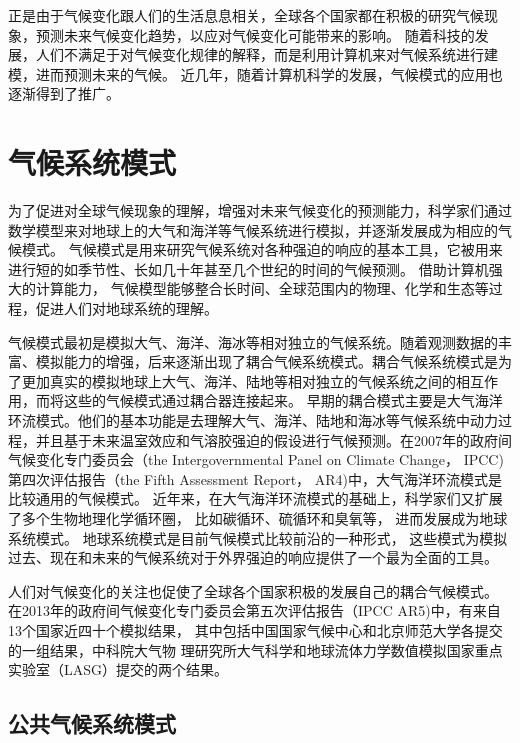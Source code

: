  
正是由于气候变化跟人们的生活息息相关，全球各个国家都在积极的研究气候现象，预测未来气候变化趋势，以应对气候变化可能带来的影响。 
随着科技的发展，人们不满足于对气候变化规律的解释，而是利用计算机来对气候系统进行建模，进而预测未来的气候。
近几年，随着计算机科学的发展，气候模式的应用也逐渐得到了推广。  



 
\section{气候系统模式}

为了促进对全球气候现象的理解，增强对未来气候变化的预测能力，科学家们通过数学模型来对地球上的大气和海洋等气候系统进行模拟，并逐渐发展成为相应的气候模式。
气候模式是用来研究气候系统对各种强迫的响应的基本工具，它被用来进行短的如季节性、长如几十年甚至几个世纪的时间的气候预测。 
借助计算机强大的计算能力， 气候模型能够整合长时间、全球范围内的物理、化学和生态等过程，促进人们对地球系统的理解\cite{hurrell2013community}。


气候模式最初是模拟大气、海洋、海冰等相对独立的气候系统。随着观测数据的丰富、模拟能力的增强，后来逐渐出现了耦合气候系统模式。耦合气候系统模式是为了更加真实的模拟地球上大气、海洋、陆地等相对独立的气候系统之间的相互作用，而将这些的气候模式通过耦合器连接起来。
早期的耦合模式主要是大气海洋环流模式。他们的基本功能是去理解大气、海洋、陆地和海冰等气候系统中动力过程，并且基于未来温室效应和气溶胶强迫的假设进行气候预测。在2007年的政府间气候变化专门委员会（the
Intergovernmental Panel on Climate Change， IPCC) 第四次评估报告（the Fifth Assessment
Report， AR4)中，大气海洋环流模式是比较通用的气候模式\cite{solomon2007climate}。
近年来，在大气海洋环流模式的基础上，科学家们又扩展了多个生物地理化学循环圈， 比如碳循环、硫循环和臭氧等， 进而发展成为地球系统模式。 地球系统模式是目前气候模式比较前沿的一种形式，
这些模式为模拟过去、现在和未来的气候系统对于外界强迫的响应提供了一个最为全面的工具。 

人们对气候变化的关注也促使了全球各个国家积极的发展自己的耦合气候模式。
在2013年的政府间气候变化专门委员会第五次评估报告（IPCC AR5)中，有来自13个国家近四十个模拟结果，
其中包括中国国家气候中心和北京师范大学各提交的一组结果，中科院大气物
理研究所大气科学和地球流体力学数值模拟国家重点实验室（LASG）提交的两个结果\cite{stocker2013ipcc}。



\subsection{公共气候系统模式}
 

